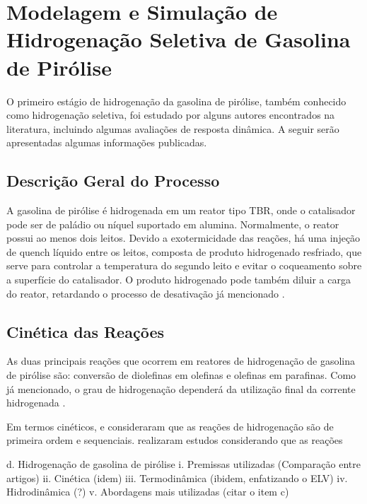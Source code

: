 \section {Modelagem e Simulação de Hidrogenação Seletiva de Gasolina de Pirólise}
\label{sec:hidrogenacaopygas}

O primeiro estágio de hidrogenação da gasolina de pirólise, também conhecido como hidrogenação seletiva, foi estudado por alguns autores encontrados na literatura, incluindo algumas avaliações de resposta dinâmica. A seguir serão apresentadas algumas informações publicadas.

\subsection{Descrição Geral do Processo} \label{sec:descricaogeral}

A gasolina de pirólise é hidrogenada em um reator tipo TBR, onde o catalisador pode ser de paládio ou níquel suportado em alumina. Normalmente, o reator possui ao menos dois leitos. Devido a exotermicidade das reações, há uma injeção de quench líquido entre os leitos, composta de produto hidrogenado resfriado, que serve para controlar a temperatura do segundo leito e evitar o coqueamento sobre a superfície do catalisador. O produto hidrogenado pode também diluir a carga do reator, retardando o processo de desativação já mencionado \cite{Cheng1986,Derrien1986,Arpornwichanop2002,Rojas2014a}.

\subsection{Cinética das Reações} \label{sec:cineticadasreacoes}

As duas principais reações que ocorrem em reatores de hidrogenação de gasolina de pirólise são: conversão de diolefinas em olefinas e olefinas em parafinas. Como já mencionado, o grau de hidrogenação dependerá da utilização final da corrente hidrogenada . 

Em termos cinéticos,  e  consideraram que as reações de hidrogenação são de primeira ordem e sequenciais. realizaram estudos considerando que as reações 

		d. Hidrogenação de gasolina de pirólise
			i. Premissas utilizadas (Comparação entre artigos)
			ii. Cinética (idem)
			iii. Termodinâmica (ibidem, enfatizando o ELV)
			iv. Hidrodinâmica (?)
			v. Abordagens mais utilizadas (citar o item c)


